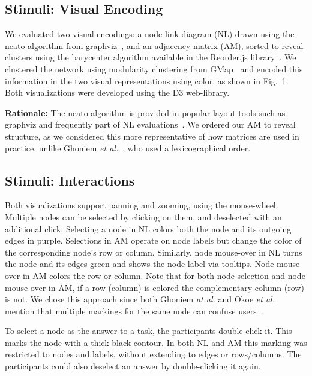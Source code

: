 \subsection{Stimuli: Visual Encoding}

We evaluated two visual encodings: a node-link diagram (NL) drawn using the neato algorithm from graphviz~\cite{graphviz},  and an adjacency matrix (AM), sorted to reveal clusters using the barycenter algorithm available in the Reorder.js library~\cite{fekete2015reorder}. We clustered the network using modularity clustering from GMap~\cite{pacvis10} and encoded this information in the two visual representations using color, as shown in Fig.~1. Both visualizations were developed using the D3 web-library.

\vspace{2mm}
\noindent
\textbf{Rationale:} The neato algorithm is provided in popular layout tools such as graphviz and
frequently part of NL evaluations~\cite{ghoniem2004comparison,jianu2014display}.
We ordered our AM to reveal structure, as we considered this more representative of how matrices are used in practice, unlike  Ghoniem {\it et al.}~\cite{ghoniem2004comparison}, who used a lexicographical order.

\subsection{Stimuli: Interactions}

Both visualizations support panning and zooming, using the mouse-wheel. Multiple nodes can be selected by clicking on them, and deselected with an additional click. Selecting a node in NL colors both the node and its outgoing edges in purple. Selections in AM operate on node labels but change the color of the corresponding node's row or column. Similarly, node mouse-over in NL turns the node and its edges green and shows the node label via tooltips. Node mouse-over in AM colors the row or column. Note that for both node selection and node mouse-over in AM, if a row (column) is colored the complementary column (row) is not.  We chose this approach since both Ghoniem {\it at al.} and Okoe {\it et al.} mention that multiple markings for the same node can confuse users~\cite{ghoniem2004comparison,jianu2014display}.

To select a node as the answer to a task, the participants double-click it. This marks the node with a thick black contour. In both NL and AM this marking was restricted to nodes and labels, without extending to edges or rows/columns. The participants could also deselect an answer by double-clicking it again.

